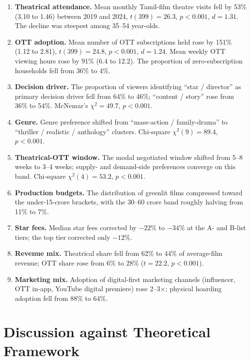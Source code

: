 \begin{enumerate}[itemsep=4pt]
\item \textbf{Theatrical attendance.}  Mean monthly Tamil-film
      theatre visits fell by 53\% (3.10 to 1.46) between 2019 and
      2024, $t(399) = 26.3$, $p < 0.001$, $d = 1.31$.  The decline
      was steepest among 35--54 year-olds.
\item \textbf{OTT adoption.}  Mean number of OTT subscriptions held
      rose by 151\% (1.12 to 2.81), $t(399) = 24.8$, $p < 0.001$,
      $d = 1.24$.  Mean weekly OTT viewing hours rose by 91\% (6.4
      to 12.2).  The proportion of zero-subscription households fell
      from 36\% to 4\%.
\item \textbf{Decision driver.}  The proportion of viewers
      identifying ``star / director'' as primary decision driver fell
      from 64\% to 46\%; ``content / story'' rose from 36\% to 54\%.
      McNemar's $\chi^2 = 49.7$, $p < 0.001$.
\item \textbf{Genre.}  Genre preference shifted from ``mass-action /
      family-drama'' to ``thriller / realistic / anthology'' clusters.
      Chi-square $\chi^2(9) = 89.4$, $p < 0.001$.
\item \textbf{Theatrical-OTT window.}  The modal negotiated window
      shifted from 5--8 weeks to 3--4 weeks; supply- and demand-side
      preferences converge on this band.  Chi-square
      $\chi^2(4) = 53.2$, $p < 0.001$.
\item \textbf{Production budgets.}  The distribution of greenlit
      films compressed toward the under-15-crore brackets, with the
      30--60 crore band roughly halving from 11\% to 7\%.
\item \textbf{Star fees.}  Median star fees corrected by $-22\%$ to
      $-34\%$ at the A- and B-list tiers; the top tier corrected
      only $-12\%$.
\item \textbf{Revenue mix.}  Theatrical share fell from 62\% to
      44\% of average-film revenue; OTT share rose from 6\% to 28\%
      ($t = 22.2$, $p < 0.001$).
\item \textbf{Marketing mix.}  Adoption of digital-first marketing
      channels (influencer, OTT in-app, YouTube digital premiere)
      rose 2--3$\times$; physical hoarding adoption fell from 88\%
      to 64\%.
\end{enumerate}

\section{Discussion against Theoretical Framework}
\label{sec:discussion_theory}

